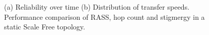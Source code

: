\begin{figure}[htbp]
    \centering
    \caption{(a) Reliability over time (b) Distribution of transfer speeds. Performance comparison of RASS, hop count and stigmergy in a static Scale Free topology.}
    \label{results:staticTopologyScale}
    \vspace{-2mm}
\end{figure}

